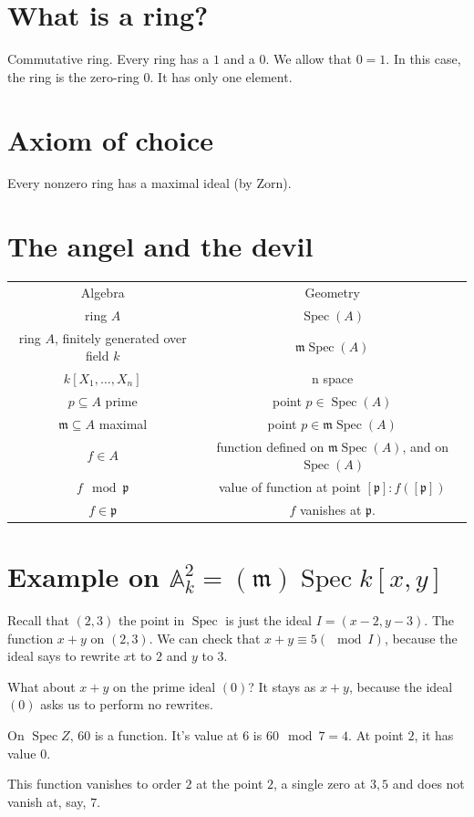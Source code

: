 \documentclass{book}
\newcommand{\A}{\ensuremath{\mathbb{A}}}
\newcommand{\spec}{\operatorname{Spec}}
\newcommand{\m}{\mathfrak{m}}
\newcommand{\p}{\mathfrak{p}}
\newcommand{\mspec}{\m\operatorname{Spec}}
\theoremstyle{definition}
\begin{document}
\section{What is a ring?}
Commutative ring. Every ring has a $1$ and a $0$. We allow that $0 = 1$.
In this case, the ring is the zero-ring $0$. It has only one element.

\section{Axiom of choice}
Every nonzero ring has a maximal ideal (by Zorn).

\section{The angel and the devil}

\begin{tabular}{cc}
    Algebra & Geometry \\
    ring $A$ & $\spec(A)$ \\
    ring $A$, finitely generated over field $k$ & $\mspec(A)$ \\
    $k[X_1, \dots, X_n]$ & n space \\
    $p \subseteq A$ prime & point $p \in \spec(A)$ \\
    \(\m \subseteq A\) maximal & point \(p \in \mspec(A)\) \\
    $f \in A$ &  function defined on $\mspec(A)$, and on $\spec(A)$ \\
    $f \mod \p$ &  value of function  at point $[\p]: f([\p])$ \\
    $f \in \p$ &  $f$ vanishes at $\p$.
\end{tabular}

\section{Example on $\A^2_k = (\m) \spec k[x, y]$}
Recall that $(2, 3)$ the point in $\spec$ is just the ideal $I = (x - 2, y - 3)$.
The function $x+y$ on $(2, 3)$. We can check that $x + y \equiv 5 (\mod I)$,
because the ideal says to rewrite $x$t to $2$ and $y$ to $3$.

What about $x + y$ on the prime ideal \( (0) \)?  It stays as $x + y$,
because the ideal  \((0)\) asks us to perform no rewrites.

On $\spec Z$, $60$ is a function. It's value at $6$ is $60 \mod 7 = 4$.
At point $2$, it has value $0$.


This function vanishes to order $2$ at the point $2$, a single zero at $3, 5$
and does not vanish at, say, $7$.
\end{document}
